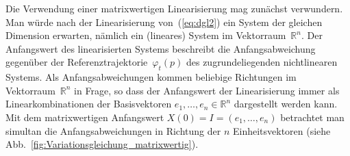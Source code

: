 Die Verwendung einer matrixwertigen Linearisierung mag zunächst verwundern.
Man würde nach der Linearisierung von~(\ref{eq:dgl2}) ein System
der gleichen Dimension erwarten, nämlich ein (lineares) System im
Vektorraum~${\mathbb{R}}^{n}$. Der Anfangswert des linearisierten Systems
beschreibt die Anfangsabweichung gegenüber der Referenztrajektorie~$\varphi_{t}(p)$
des zugrundeliegenden nichtlinearen Systems. Als Anfangsabweichungen
kommen beliebige Richtungen im Vektorraum~${\mathbb{R}}^{n}$ in Frage, so
dass der Anfangswert der Linearisierung immer als Linearkombinationen
der Basisvektoren $e_{1},\ldots,e_{n}\in{\mathbb{R}}^{n}$ dargestellt werden
kann. Mit dem matrixwertigen Anfangswert $X(0)=I=(e_{1},\ldots,e_{n})$
betrachtet man simultan die Anfangsabweichungen in Richtung der $n$
Einheitsvektoren (siehe Abb.~\ref{fig:Variationsgleichung_matrixwertig}).



